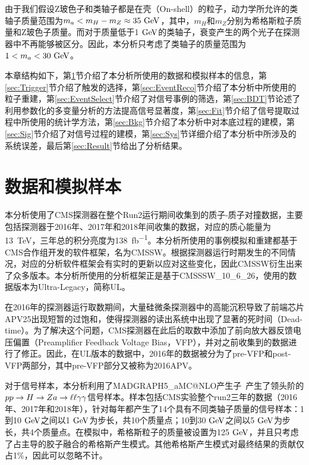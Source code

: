 由于我们假设Z玻色子和类轴子都是在壳（On-shell）的粒子，动力学所允许的类轴子质量范围为$m_{a}<m_{H}-m_{Z}\approx35\GeV$，其中，$m_H$和$m_Z$分别为希格斯粒子质量和Z玻色子质量。而对于质量低于1$\GeV$的类轴子，衰变产生的两个光子在探测器中不再能够被区分。因此，本分析只考虑了类轴子的质量范围为$1 < m_{a} < 30\GeV$。

本章结构如下，第\ref{sec:MCData}节介绍了本分析所使用的数据和模拟样本的信息，第\ref{sec:Trigger}节介绍了触发的选择，第\ref{sec:EventReco}节介绍了本分析中所使用的粒子重建，第\ref{sec:EventSelect}节介绍了对信号事例的筛选，第\ref{sec:BDT}节论述了利用参数化的多变量分析的方法提高信号显著度，第\ref{sec:Fit}节介绍了信号提取过程中所使用的统计学方法，第\ref{sec:Bkg}节介绍了本分析中对本底过程的建模，第\ref{sec:Sig}节介绍了对信号过程的建模，第\ref{sec:Sys}节详细介绍了本分析中所涉及的系统误差，最后第\ref{sec:Result}节给出了分析结果。

\section{数据和模拟样本}\label{sec:MCData}

本分析使用了CMS探测器在整个Run2运行期间收集到的质子-质子对撞数据，主要包括探测器于2016年、2017年和2018年间收集的数据，对应的质心能量为13~\si{TeV}，三年总的积分亮度为138~\si{fb^{-1}}。本分析所使用的事例模拟和重建都基于CMS合作组开发的软件框架，名为CMSSW。根据探测器运行时期发生的不同情况，对应的分析软件框架会有实时的更新以应对这些变化，因此CMSSW衍生出来了众多版本。本分析所使用的分析框架正是基于CMSSSW\_10\_6\_26，使用的数据版本为Ultra-Legacy，简称UL。

在2016年的探测器运行取数期间，大量硅微条探测器中的高能沉积导致了前端芯片APV25出现短暂的过饱和，使得探测器的读出系统中出现了显著的死时间（Dead-time）。为了解决这个问题，CMS探测器在此后的取数中添加了前向放大器反馈电压偏置（Preamplifier Feedback Voltage Bias，VFP），并对之前收集到的数据进行了修正。因此，在UL版本的数据中，2016年的数据被分为了pre-VFP和post-VFP两部分，其中pre-VFP部分又被称为2016APV。

对于信号样本，本分析利用了MADGRAPH5\_aMC@NLO产生子~\cite{alwall2014automated, Alwall:2007fs, Frederix:2012ps}产生了领头阶的$pp\rightarrow H\to Za\to\ell\ell\gamma\gamma$信号样本。样本包括CMS实验整个run2三年的数据（2016年、2017年和2018年），针对每年都产生了14个具有不同类轴子质量的信号样本：1到10$\GeV$之间以1$\GeV$为步长，共10个质量点；10到30$\GeV$之间以5$\GeV$为步长，共4个质量点。在模拟中，希格斯粒子的质量被设置为125$\GeV$，并且只考虑了占主导的胶子融合的希格斯产生模式。其他希格斯产生模式对最终结果的贡献仅占1\%，因此可以忽略不计。


